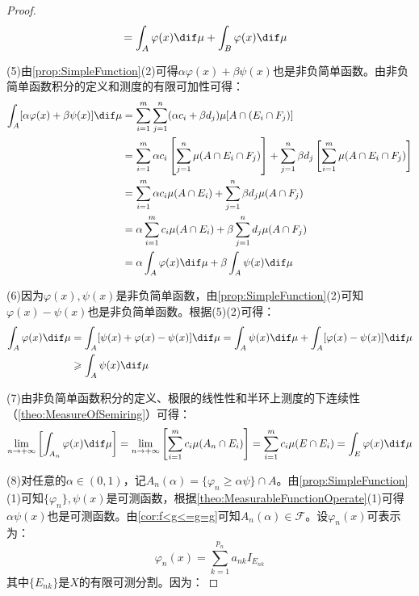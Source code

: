 \begin{proof}
\begin{align*}
		&=\int_{A}\varphi(x)\dif\mu+\int_{B}\varphi(x)\dif\mu
	\end{align*}\par
	(5)由\cref{prop:SimpleFunction}(2)可得$\alpha\varphi(x)+\beta\psi(x)$也是非负简单函数。由非负简单函数积分的定义和测度的有限可加性可得：
	\begin{align*}
		\int_{A}[\alpha\varphi(x)+\beta\psi(x)]\dif\mu
		&=\sum_{i=1}^{m}\sum_{j=1}^{n}(\alpha c_i+\beta d_j)\mu[A\cap (E_i\cap F_j)] \\
		&=\sum_{i=1}^{m}\alpha c_i\left[\sum_{j=1}^{n}\mu(A\cap E_i\cap F_j)\right]+\sum_{j=1}^{n}\beta d_j\left[\sum_{i=1}^{m}\mu(A\cap E_i\cap F_j)\right] \\
		&=\sum_{i=1}^{m}\alpha c_i\mu(A\cap E_i)+\sum_{j=1}^{n}\beta d_j\mu(A\cap F_j) \\ 
		&=\alpha\sum_{i=1}^{m}c_i\mu(A\cap E_i)+\beta\sum_{j=1}^{n}d_j\mu(A\cap F_j) \\
		&=\alpha\int_{A}\varphi(x)\dif\mu+\beta\int_{A}\psi(x)\dif\mu
	\end{align*}\par
	(6)因为$\varphi(x),\psi(x)$是非负简单函数，由\cref{prop:SimpleFunction}(2)可知$\varphi(x)-\psi(x)$也是非负简单函数。根据(5)(2)可得：
	\begin{align*}
		\int_{A}^{}\varphi(x)\dif\mu&=\int_{A}^{}[\psi(x)+\varphi(x)-\psi(x)]\dif\mu=\int_{A}^{}\psi(x)\dif\mu+\int_{A}^{}[\varphi(x)-\psi(x)]\dif\mu \\
		&\geqslant\int_{A}^{}\psi(x)\dif\mu
	\end{align*}\par
	(7)由非负简单函数积分的定义、极限的线性性和半环上测度的下连续性（\cref{theo:MeasureOfSemiring}）可得：
	\begin{equation*}
		\lim_{n\to+\infty}\left[\int_{A_n}\varphi(x)\dif\mu\right]
		=\lim_{n\to+\infty}\left[\sum_{i=1}^{m}c_i\mu(A_n\cap E_i)\right]
		=\sum_{i=1}^{m}c_i\mu(E\cap E_i)
		=\int_{E}\varphi(x)\dif\mu
	\end{equation*}\par
	(8)对任意的$\alpha\in(0,1)$，记$A_n(\alpha)=\{\varphi_n\geqslant\alpha\psi\}\cap  A$。由\cref{prop:SimpleFunction}(1)可知$\{\varphi_n\},\psi(x)$是可测函数，根据\cref{theo:MeasurableFunctionOperate}(1)可得$\alpha\psi(x)$也是可测函数。由\cref{cor:f<g<=g=g}可知$A_n(\alpha)\in \mathscr{F}$。设$\varphi_n(x)$可表示为：
	\begin{equation*}
		\varphi_n(x)=\sum_{k=1}^{p_n}a_{nk}I_{E_{nk}}
	\end{equation*}
	其中$\{E_{nk}\}$是$X$的有限可测分割。因为：

\end{proof}
